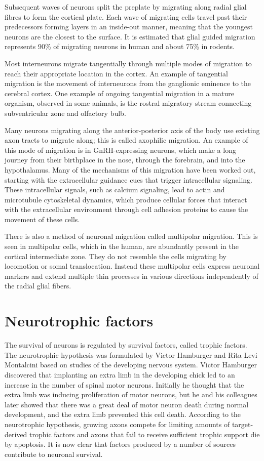Subsequent waves of neurons split the preplate by migrating along radial glial fibres to form the cortical plate. Each wave of migrating cells travel past their predecessors forming layers in an inside-out manner, meaning that the youngest neurons are the closest to the surface. It is estimated that glial guided migration represents 90\% of migrating neurons in human and about 75\% in rodents.

Most interneurons migrate tangentially through multiple modes of migration to reach their appropriate location in the cortex. An example of tangential migration is the movement of interneurons from the ganglionic eminence to the cerebral cortex. One example of ongoing tangential migration in a mature organism, observed in some animals, is the rostral migratory stream connecting subventricular zone and olfactory bulb.

Many neurons migrating along the anterior-posterior axis of the body use existing axon tracts to migrate along; this is called axophilic migration. An example of this mode of migration is in GnRH-expressing neurons, which make a long journey from their birthplace in the nose, through the forebrain, and into the hypothalamus. Many of the mechanisms of this migration have been worked out, starting with the extracellular guidance cues that trigger intracellular signaling. These intracellular signals, such as calcium signaling, lead to actin and microtubule cytoskeletal dynamics, which produce cellular forces that interact with the extracellular environment through cell adhesion proteins to cause the movement of these cells.

There is also a method of neuronal migration called multipolar migration. This is seen in multipolar cells, which in the human, are abundantly present in the cortical intermediate zone. They do not resemble the cells migrating by locomotion or somal translocation. Instead these multipolar cells express neuronal markers and extend multiple thin processes in various directions independently of the radial glial fibers.

\hypertarget{neurotrophic-factors}{%
\section{Neurotrophic factors}\label{neurotrophic-factors}}

The survival of neurons is regulated by survival factors, called trophic factors. The neurotrophic hypothesis was formulated by Victor Hamburger and Rita Levi Montalcini based on studies of the developing nervous system. Victor Hamburger discovered that implanting an extra limb in the developing chick led to an increase in the number of spinal motor neurons. Initially he thought that the extra limb was inducing proliferation of motor neurons, but he and his colleagues later showed that there was a great deal of motor neuron death during normal development, and the extra limb prevented this cell death. According to the neurotrophic hypothesis, growing axons compete for limiting amounts of target-derived trophic factors and axons that fail to receive sufficient trophic support die by apoptosis. It is now clear that factors produced by a number of sources contribute to neuronal survival.

